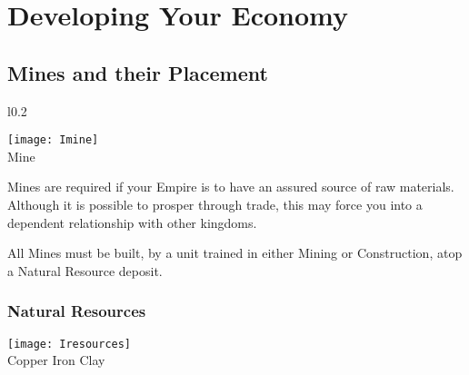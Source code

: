 
\chapter{Developing Your Economy}


\section{Mines and their Placement}

\begin{wrapfigure}{l}{0.2\textwidth}
	\vspace{-20pt}
	\begin{center}
		\texttt{[image: Imine]}
		\\ Mine
	\end{center}
	\vspace{-20pt}
\end{wrapfigure}

Mines are required if your Empire is to have an assured source of raw materials. Although it is possible to prosper through trade, this may force you into a dependent relationship with other kingdoms.

All Mines must be built, by a unit trained in either Mining or Construction, atop a Natural Resource deposit. \\

\subsection{Natural Resources}


\begin{center}
\texttt{[image: Iresources]}
\\ Copper Iron Clay
\end{center}

